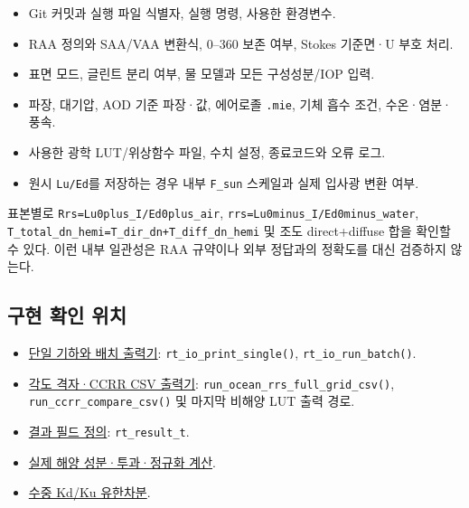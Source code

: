 \begin{itemize}
\item Git 커밋과 실행 파일 식별자, 실행 명령, 사용한 환경변수.
\item RAA 정의와 SAA/VAA 변환식, 0--360\textdegree{} 보존 여부, Stokes 기준면·U 부호 처리.
\item 표면 모드, 글린트 분리 여부, 물 모델과 모든 구성성분/IOP 입력.
\item 파장, 대기압, AOD 기준 파장·값, 에어로졸 \texttt{.\allowbreak{}mie}, 기체 흡수 조건, 수온·염분·풍속.
\item 사용한 광학 LUT/위상함수 파일, 수치 설정, 종료코드와 오류 로그.
\item 원시 \texttt{Lu/\allowbreak{}Ed}를 저장하는 경우 내부 \texttt{F\_\allowbreak{}sun} 스케일과 실제 입사광 변환 여부.
\end{itemize}

표본별로 \texttt{Rrs=\allowbreak{}Lu0plus\_\allowbreak{}I/\allowbreak{}Ed0plus\_\allowbreak{}air}, \texttt{rrs=\allowbreak{}Lu0minus\_\allowbreak{}I/\allowbreak{}Ed0minus\_\allowbreak{}water}, \texttt{T\_\allowbreak{}total\_\allowbreak{}dn\_\allowbreak{}hemi=\allowbreak{}T\_\allowbreak{}dir\_\allowbreak{}dn+T\_\allowbreak{}diff\_\allowbreak{}dn\_\allowbreak{}hemi} 및 조도 direct+diffuse 합을 확인할 수 있다. 이런 내부 일관성은 RAA 규약이나 외부 정답과의 정확도를 대신 검증하지 않는다.

\subsection{구현 확인 위치}
\label{sec:auto:05_output_formats:10.1}
\begin{itemize}
\item \href{https://github.com/brtnt/OCRT/blob/54861c68e35ec5aaa3938fad53e93dc2dfa7eb1d/code/OCRT_C/src/rt_io.c}{단일 기하와 배치 출력기}: \texttt{rt\_\allowbreak{}io\_\allowbreak{}print\_\allowbreak{}single()}, \texttt{rt\_\allowbreak{}io\_\allowbreak{}run\_\allowbreak{}batch()}.
\item \href{https://github.com/brtnt/OCRT/blob/54861c68e35ec5aaa3938fad53e93dc2dfa7eb1d/code/OCRT_C/src/main.c}{각도 격자·CCRR CSV 출력기}: \texttt{run\_\allowbreak{}ocean\_\allowbreak{}rrs\_\allowbreak{}full\_\allowbreak{}grid\_\allowbreak{}csv()}, \texttt{run\_\allowbreak{}ccrr\_\allowbreak{}compare\_\allowbreak{}csv()} 및 마지막 비해양 LUT 출력 경로.
\item \href{https://github.com/brtnt/OCRT/blob/54861c68e35ec5aaa3938fad53e93dc2dfa7eb1d/code/OCRT_C/src/rt_types.h}{결과 필드 정의}: \texttt{rt\_\allowbreak{}result\_\allowbreak{}t}.
\item \href{https://github.com/brtnt/OCRT/blob/54861c68e35ec5aaa3938fad53e93dc2dfa7eb1d/code/OCRT_C/src/rt_solver.c}{실제 해양 성분·투과·정규화 계산}.
\item \href{https://github.com/brtnt/OCRT/blob/54861c68e35ec5aaa3938fad53e93dc2dfa7eb1d/code/OCRT_C/src/rt_water_rt.c}{수중 Kd/Ku 유한차분}.
\end{itemize}

